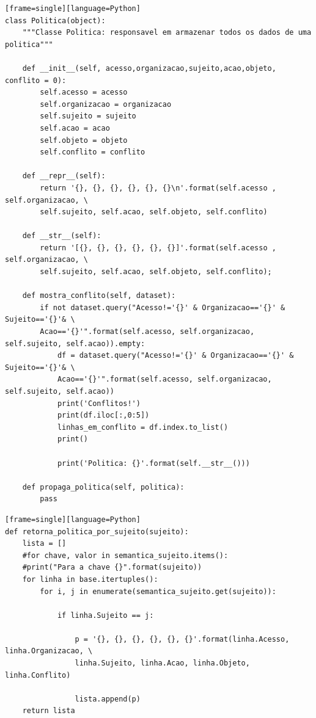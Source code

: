 \begin{lstlisting}[caption={Classse Política},label=lst-classe-politica][frame=single][language=Python]
class Politica(object):
    """Classe Politica: responsavel em armazenar todos os dados de uma politica"""

    def __init__(self, acesso,organizacao,sujeito,acao,objeto, conflito = 0):
        self.acesso = acesso
        self.organizacao = organizacao
        self.sujeito = sujeito
        self.acao = acao
        self.objeto = objeto
        self.conflito = conflito

    def __repr__(self):
        return '{}, {}, {}, {}, {}, {}\n'.format(self.acesso , self.organizacao, \
        self.sujeito, self.acao, self.objeto, self.conflito)

    def __str__(self):
        return '[{}, {}, {}, {}, {}, {}]'.format(self.acesso , self.organizacao, \
        self.sujeito, self.acao, self.objeto, self.conflito);

    def mostra_conflito(self, dataset):
        if not dataset.query("Acesso!='{}' & Organizacao=='{}' & Sujeito=='{}'& \
        Acao=='{}'".format(self.acesso, self.organizacao, self.sujeito, self.acao)).empty:
            df = dataset.query("Acesso!='{}' & Organizacao=='{}' & Sujeito=='{}'& \
            Acao=='{}'".format(self.acesso, self.organizacao, self.sujeito, self.acao))
            print('Conflitos!')
            print(df.iloc[:,0:5])
            linhas_em_conflito = df.index.to_list()
            print()

            print('Politica: {}'.format(self.__str__()))
        
    def propaga_politica(self, politica):
        pass
\end{lstlisting}

\begin{lstlisting}[caption={Função que retorna políticas por sujeito},label=lst-func-retorna-por-sujeito][frame=single][language=Python]
def retorna_politica_por_sujeito(sujeito):
    lista = []
    #for chave, valor in semantica_sujeito.items():
    #print("Para a chave {}".format(sujeito))
    for linha in base.itertuples():
        for i, j in enumerate(semantica_sujeito.get(sujeito)):

            if linha.Sujeito == j:

                p = '{}, {}, {}, {}, {}, {}'.format(linha.Acesso, linha.Organizacao, \
                linha.Sujeito, linha.Acao, linha.Objeto, linha.Conflito)

                lista.append(p)
    return lista
\end{lstlisting}


